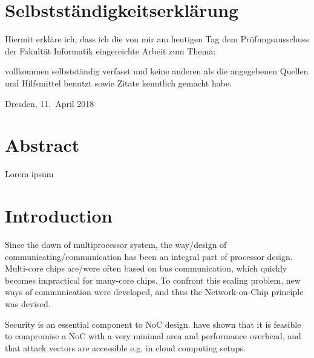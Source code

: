 \documentclass[
	paper=a4,
	fontsize=11pt,
	parskip=full %
]{scrreprt}
\begin{document}
	\chapter*{Selbstständigkeitserklärung}
	Hiermit erkläre ich, dass ich die von mir am heutigen Tag dem Prüfungsausschuss der Fakultät Informatik eingereichte Arbeit zum Thema:
	\begin{center}
		\textit{\thetitle} 
	\end{center}
	
	vollkommen selbstständig verfasst und keine anderen als die angegebenen Quellen und Hilfsmittel benutzt sowie Zitate kenntlich gemacht habe.
	
	Dresden, 11.\ April 2018 \\ %
	\theauthor
	
	
	\chapter*{Abstract}
    Lorem ipsum
	
	\tableofcontents
	
	
	\listoftables
	\vspace{-2.6\baselineskip}
	\begingroup
	\let\clearpage\relax
	\listoffigures
	\endgroup
	
	
	\chapter{Introduction}\label{ch:introduction}
    Since the dawn of multiprocessor system, the way/design of communicating/communication has been an integral part of processor design.
    Multi-core chips are/were often based on bus communication, which quickly becomes impractical for many-core chips.
    To confront this scaling problem, new ways of communication were developed, and thus the Network-on-Chip principle was devised.

    Security is an essential component to NoC design. \citeauthor{ancajas14fortnocs} have shown that it is feasible to compromise a NoC with a very
    minimal area and performance overhead, and that attack vectors are accessible e.g. in cloud computing setups. \cite{ancajas14fortnocs}
\end{document}
